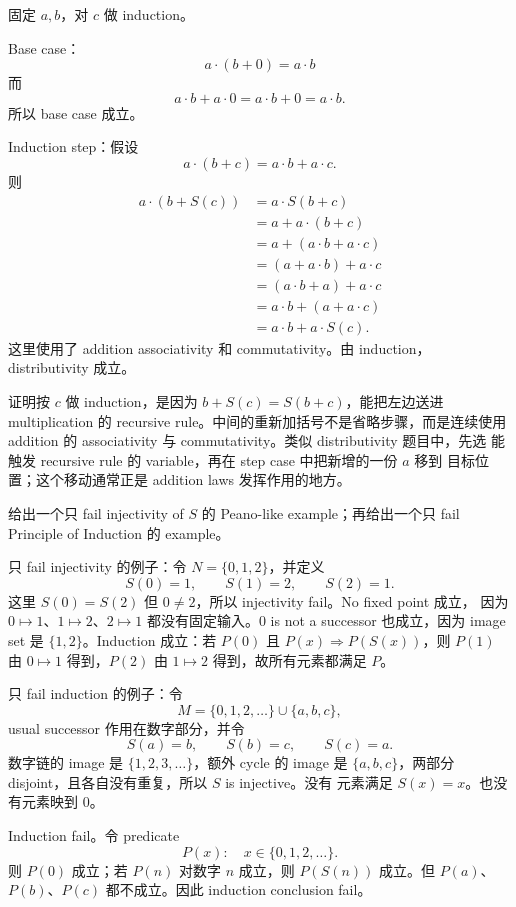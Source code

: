 \begin{solution}
固定 \(a,b\)，对 \(c\) 做 induction。

Base case：
\[
  a\cdot(b+0)=a\cdot b
\]
而
\[
  a\cdot b+a\cdot0=a\cdot b+0=a\cdot b.
\]
所以 base case 成立。

Induction step：假设
\[
  a\cdot(b+c)=a\cdot b+a\cdot c.
\]
则
\[
\begin{aligned}
a\cdot(b+S(c))
  &=a\cdot S(b+c)\\
  &=a+a\cdot(b+c)\\
  &=a+(a\cdot b+a\cdot c)\\
  &=(a+a\cdot b)+a\cdot c\\
  &=(a\cdot b+a)+a\cdot c\\
  &=a\cdot b+(a+a\cdot c)\\
  &=a\cdot b+a\cdot S(c).
\end{aligned}
\]
这里使用了 addition associativity 和 commutativity。由 induction，
distributivity 成立。
\end{solution}

\begin{explanation}
证明按 \(c\) 做 induction，是因为 \(b+S(c)=S(b+c)\)，能把左边送进
multiplication 的 recursive rule。中间的重新加括号不是省略步骤，而是连续使用
addition 的 associativity 与 commutativity。类似 distributivity 题目中，先选
能触发 recursive rule 的 variable，再在 step case 中把新增的一份 \(a\) 移到
目标位置；这个移动通常正是 addition laws 发挥作用的地方。
\end{explanation}

\begin{exerciseblock}
给出一个只 fail injectivity of \(S\) 的 Peano-like example；再给出一个只 fail
Principle of Induction 的 example。
\end{exerciseblock}

\begin{solution}
只 fail injectivity 的例子：令 \(N=\{0,1,2\}\)，并定义
\[
  S(0)=1,\qquad S(1)=2,\qquad S(2)=1.
\]
这里 \(S(0)=S(2)\) 但 \(0\neq2\)，所以 injectivity fail。No fixed point 成立，
因为 \(0\mapsto1\)、\(1\mapsto2\)、\(2\mapsto1\) 都没有固定输入。\(0\) is not
a successor 也成立，因为 image set 是 \(\{1,2\}\)。Induction 成立：若 \(P(0)\)
且 \(P(x)\Rightarrow P(S(x))\)，则 \(P(1)\) 由 \(0\mapsto1\) 得到，\(P(2)\) 由
\(1\mapsto2\) 得到，故所有元素都满足 \(P\)。

只 fail induction 的例子：令
\[
  M=\{0,1,2,\ldots\}\cup\{a,b,c\},
\]
usual successor 作用在数字部分，并令
\[
  S(a)=b,\qquad S(b)=c,\qquad S(c)=a.
\]
数字链的 image 是 \(\{1,2,3,\ldots\}\)，额外 cycle 的 image 是
\(\{a,b,c\}\)，两部分 disjoint，且各自没有重复，所以 \(S\) is injective。没有
元素满足 \(S(x)=x\)。也没有元素映到 \(0\)。

Induction fail。令 predicate
\[
  P(x):\quad x\in\{0,1,2,\ldots\}.
\]
则 \(P(0)\) 成立；若 \(P(n)\) 对数字 \(n\) 成立，则 \(P(S(n))\) 成立。但
\(P(a)\)、\(P(b)\)、\(P(c)\) 都不成立。因此 induction conclusion fail。
\end{solution}

